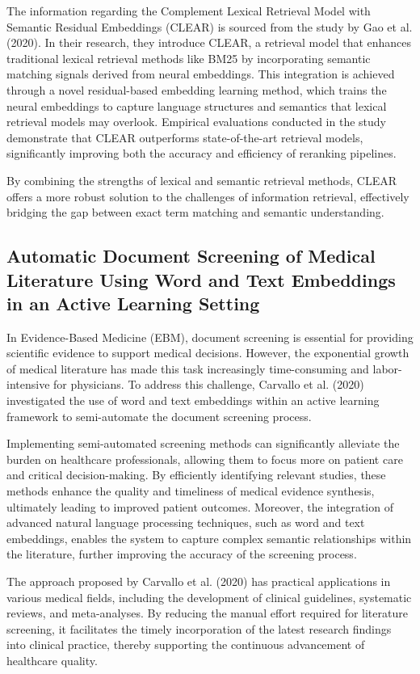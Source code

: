 The information regarding the Complement Lexical Retrieval Model with Semantic Residual Embeddings (CLEAR) is sourced from the study by Gao et al. (2020). In their research, they introduce CLEAR, a retrieval model that enhances traditional lexical retrieval methods like BM25 by incorporating semantic matching signals derived from neural embeddings. This integration is achieved through a novel residual-based embedding learning method, which trains the neural embeddings to capture language structures and semantics that lexical retrieval models may overlook. Empirical evaluations conducted in the study demonstrate that CLEAR outperforms state-of-the-art retrieval models, significantly improving both the accuracy and efficiency of reranking pipelines.

By combining the strengths of lexical and semantic retrieval methods, CLEAR offers a more robust solution to the challenges of information retrieval, effectively bridging the gap between exact term matching and semantic understanding.

\subsection{Automatic Document Screening of Medical Literature Using Word and Text Embeddings in an Active Learning Setting}

In Evidence-Based Medicine (EBM), document screening is essential for providing scientific evidence to support medical decisions. However, the exponential growth of medical literature has made this task increasingly time-consuming and labor-intensive for physicians. To address this challenge, Carvallo et al. (2020) investigated the use of word and text embeddings within an active learning framework to semi-automate the document screening process.

Implementing semi-automated screening methods can significantly alleviate the burden on healthcare professionals, allowing them to focus more on patient care and critical decision-making. By efficiently identifying relevant studies, these methods enhance the quality and timeliness of medical evidence synthesis, ultimately leading to improved patient outcomes. Moreover, the integration of advanced natural language processing techniques, such as word and text embeddings, enables the system to capture complex semantic relationships within the literature, further improving the accuracy of the screening process.

The approach proposed by Carvallo et al. (2020) has practical applications in various medical fields, including the development of clinical guidelines, systematic reviews, and meta-analyses. By reducing the manual effort required for literature screening, it facilitates the timely incorporation of the latest research findings into clinical practice, thereby supporting the continuous advancement of healthcare quality.

